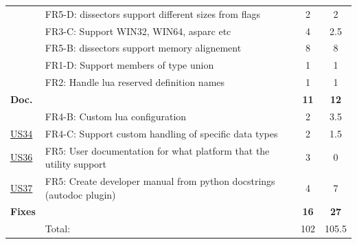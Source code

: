 \begin{table}[!htb]
\begin{tabularx}{\textwidth}{l X c c}
	 & FR5-D: \Glspl{dissector} support different sizes from flags & 2 & 2 \\
	 & FR3-C: Support WIN32, WIN64, \gls{asparc} etc & 4 & 2.5 \\
	 & FR5-B: \Glspl{dissector} support memory alignement & 8 & 8 \\
	 & FR1-D: Support members of type \gls{union} & 1 & 1 \\
	 & FR2: Handle \Gls{lua} reserved definition names & 1 & 1 \\
	\addlinespace
	\textbf{Doc.} &  & \textbf{11} & \textbf{12} \\
	 & FR4-B: Custom \Gls{lua} configuration & 2 & 3.5\\
	\hyperref[tab:req:stories8]{US34} & FR4-C: Support custom handling of specific data types & 2 & 1.5 \\
	\hyperref[tab:req:stories9]{US36} & FR5: User documentation for what platform that the \gls{utility} support & 3 & 0 \\
	\hyperref[tab:req:stories9]{US37} & FR5: Create developer manual from \Gls{python} docstrings (autodoc plugin) & 4 & 7 \\
	\addlinespace
	\textbf{Fixes} &  & \textbf{16} & \textbf{27} \\
	\midrule
	& Total: & 102 &  105.5\\
	\bottomrule
\end{tabularx}
\end{table}


